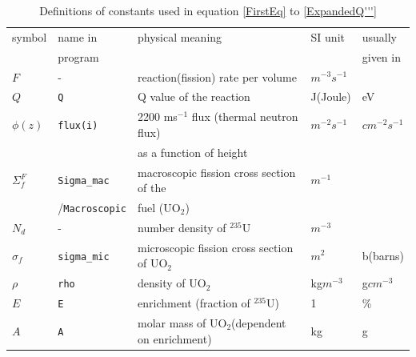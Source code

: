 \documentclass[a4paper, 12pt]{article}
\begin{document}
\newpage
\begin{appendices} 
	
\begin{table}[h!b]
\begin{tabular}{lllll}
\hline
symbol&name in&physical meaning & SI unit&usually\\
&program&&& given in\\

\hline
\hline

$F$		&-& reaction(fission) rate per volume							&
$m^{-3}s^{-1}$&\\

$Q$ 	&\texttt{Q}&Q value of the reaction 							&
J(Joule)&eV\\

$\phi(z)$&\texttt{flux(i)}& 2200 ms${}^{-1}$ flux (thermal neutron flux)&
$m^{-2}s^{-1}$&$cm^{-2}s^{-1}$\\
&& as a function of height&&\\

$\Sigma_f^F$&\texttt{Sigma\_mac}& macroscopic fission cross section of the &
$m^{-1}$&\\
&/\texttt{Macroscopic}&fuel (UO${}_2$)&&\\

$N_d$ 	&-& number density of ${}^{235}$U 									&$m^{-3}$&\\
$\sigma_f$&\texttt{sigma\_mic}& microscopic fission cross section of UO${}_2$
&$m^{2}$&b(barns)\\

$\rho $ &\texttt{rho}& density of UO${}_2$
&kg$m^{-3}$&g$cm^{-3}$\\

$E$ 	&\texttt{E}& enrichment (fraction of ${}^{235}$U)								&1&\%\\

$A$ 	&\texttt{A}& molar mass of UO${}_2$(dependent on enrichment)					&kg&g\\
\hline
\end{tabular}
\caption{Definitions of constants used in equation \ref{FirstEq} to \ref{ExpandedQ'''} }\label{table1}
\end{table}

\begin{center}
	
\begin{table}[h!b]
\centering
\begin{tabular}{llll}


\end{tabular}
\end{table}
\end{center}
\end{appendices}
\end{document}
